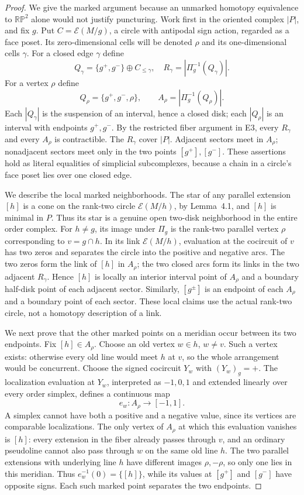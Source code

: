 \begin{proof}
We give the marked argument because an unmarked homotopy equivalence to
$\mathbb {RP}^2$ alone would not justify puncturing.
Work first in the oriented complex $|P|$, and fix $g$. Put
$C=\mathcal E(M/g)$, a circle with antipodal sign action, regarded as a
face poset. Its zero-dimensional cells will be denoted $\rho$ and its
one-dimensional cells $\gamma$. For a closed edge $\gamma$ define
\[
 Q_\gamma=\{g^+,g^-\}\oplus C_{\leq\gamma},\quad
 R_\gamma=|\Pi_g^{-1}(Q_\gamma)|.
\]
For a vertex $\rho$ define
\[
 Q_\rho=\{g^+,g^-,\rho\},\qquad
 A_\rho=|\Pi_g^{-1}(Q_\rho)|.
\]
Each $|Q_\gamma|$ is the suspension of an interval, hence a closed disk;
each $|Q_\rho|$ is an interval with endpoints $g^+,g^-$. By the restricted
fiber argument in E3, every $R_\gamma$ and every $A_\rho$ is contractible.
The $R_\gamma$ cover $|P|$. Adjacent sectors meet in $A_\rho$; nonadjacent
sectors meet only in the two points $[g^+],[g^-]$. These assertions hold as
literal equalities of simplicial subcomplexes, because a chain in a circle's
face poset lies over one closed edge.

We describe the local marked neighborhoods. The star of any parallel
extension $[h]$ is a cone on the rank-two circle $\mathcal E(M/h)$, by
Lemma~4.1, and $[h]$ is minimal in $P$. Thus its star is a genuine open
two-disk neighborhood in the entire order complex. For $h\neq g$, its image
under $\Pi_g$ is the rank-two parallel vertex $\rho$ corresponding to
$v=g\cap h$. In its link $\mathcal E(M/h)$, evaluation at the cocircuit of
$v$ has two zeros and separates the circle into the positive and negative
arcs. The two zeros form the link of $[h]$ in $A_\rho$; the two closed arcs
form its links in the two adjacent $R_\gamma$. Hence $[h]$ is locally an
interior interval point of $A_\rho$ and a boundary half-disk point of each
adjacent sector. Similarly, $[g^\pm]$ is an endpoint of each $A_\rho$ and a
boundary point of each sector. These local claims use the actual rank-two
circle, not a homotopy description of a link.

We next prove that the other marked points on a meridian occur between its
two endpoints. Fix $[h]\in A_\rho$. Choose an old vertex $w\in h$, $w\neq v$.
Such a vertex exists: otherwise every old line would meet $h$ at $v$, so the
whole arrangement would be concurrent. Choose the signed cocircuit $Y_w$
with $(Y_w)_g=+$. The localization evaluation at $Y_w$, interpreted as
$-1,0,1$ and extended linearly over every order simplex, defines a continuous
map
\[
 e_w:A_\rho\longrightarrow[-1,1].
\]
A simplex cannot have both a positive and a negative value, since its
vertices are comparable localizations. The only vertex of $A_\rho$ at
which this evaluation vanishes is $[h]$: every extension in the fiber
already passes through $v$, and an ordinary pseudoline cannot also pass
through $w$ on the same old line $h$. The two parallel extensions with
underlying line $h$ have different images $\rho,-\rho$, so only one lies
in this meridian. Thus $e_w^{-1}(0)=\{[h]\}$, while its values at $[g^+]$
and $[g^-]$ have opposite signs. Each such marked point separates the two
endpoints.


\end{proof}
